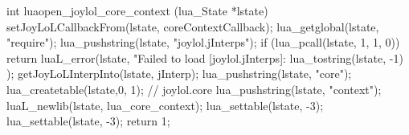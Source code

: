 \startCCode
int luaopen_joylol_core_context (lua_State *lstate) {
  setJoyLoLCallbackFrom(lstate, coreContextCallback);
  lua_getglobal(lstate, "require");
  lua_pushstring(lstate, "joylol.jInterps");
  if (lua_pcall(lstate, 1, 1, 0)) {
    return luaL_error(lstate,
      "Failed to load [joylol.jInterps]\nERROR:\n%
      lua_tostring(lstate, -1)
    );
  }
  getJoyLoLInterpInto(lstate, jInterp);
  lua_pushstring(lstate, "core");
  lua_createtable(lstate,0, 1); // joylol.core 
  lua_pushstring(lstate, "context");
  luaL_newlib(lstate, lua_core_context);
  lua_settable(lstate, -3);
  lua_settable(lstate, -3);
  return 1;
}
\stopCCode